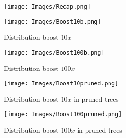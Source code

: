 \documentclass[a4paper]{article}
\begin{document}
\newpage
\fancyhfoffset[R]{0pt}
\fancyhfoffset[L]{0pt}
\begin{landscape}
\begin{figure}
	\centering
	\texttt{[image: Images/Recap.png]}
	\label{Recap}
\end{figure}	
\end{landscape}


\newpage
{}
\fancyhfoffset[R]{-50pt}
\fancyhfoffset[L]{-50pt}
\begin{figure}[h]
	\centering
	\texttt{[image: Images/Boost10b.png]}
	\caption{Distribution boost $10x$}
	\label{Boost 10}
\end{figure}

\begin{figure}[h]
	\centering
	\texttt{[image: Images/Boost100b.png]}
	\caption{Distribution boost $100x$}
	\label{Boost 100}
\end{figure}
\newpage
\begin{figure}[h]
	\centering
	\texttt{[image: Images/Boost10pruned.png]}
	\caption{Distribution boost $10x$ in pruned trees}
	\label{Boost 10 pruned}
\end{figure}

\begin{figure}[h]
	\centering
	\texttt{[image: Images/Boost100pruned.png]}
	\caption{Distribution boost $100x$ in pruned trees}
	\label{Boost 100 pruned}
\end{figure}
\restoregeometry
\end{document}
